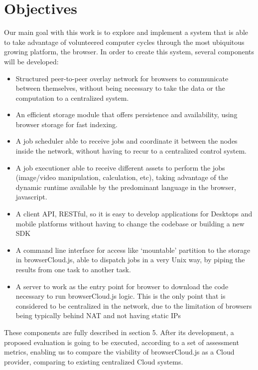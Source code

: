 
% 
% 

\section{Objectives}

Our main goal with this work is to explore and implement a system that is able to take advantage of volunteered computer cycles through the most ubiquitous growing platform, the browser. In order to create this system, several components will be developed:

\begin{itemize}
  \item Structured peer-to-peer overlay network for browsers to communicate between themselves, without being necessary to take the data or the computation to a centralized system.
  \item An efficient storage module that offers persistence and availability, using browser storage for fast indexing.
  \item A job scheduler able to receive jobs and coordinate it between the nodes inside the network, without having to recur to a centralized control system.
  \item A job executioner able to receive different assets to perform the jobs (image/video manipulation, calculation, etc), taking advantage of the dynamic runtime available by the predominant language in the browser, javascript.
  \item A client API, RESTful, so it is easy to develop applications for Desktops and mobile platforms without having to change the codebase or building a new SDK
  \item A command line interface for access like `mountable' partition to the storage in browserCloud.js, able to dispatch jobs in a very Unix way, by piping the results from one task to another task.
  \item A server to work as the entry point for browser to download the code necessary to run browserCloud.js logic. This is the only point that is considered to be centralized in the network, due to the limitation of browsers being typically behind NAT and not having static IPs
\end{itemize}

These components are fully described in section 5. After its development, a proposed evaluation is going to be executed, according to a set of assessment metrics, enabling us to compare the viability of browserCloud.js as a Cloud provider, comparing to existing centralized Cloud systems.
